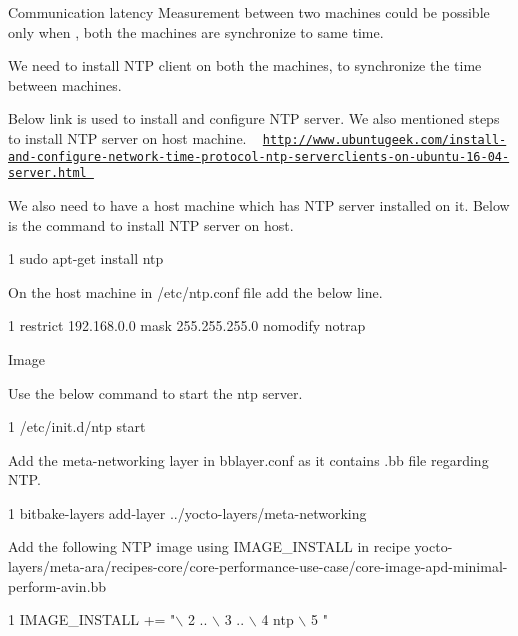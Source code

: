 \begin{DoxyEnumerate}
\item Communication latency Measurement between two machines could be possible only when , both the machines are synchronize to same time.
\item We need to install N\+TP client on both the machines, to synchronize the time between machines.
\item Below link is used to install and configure N\+TP server. We also mentioned steps to install N\+TP server on host machine. ~\newline
 \href{http://www.ubuntugeek.com/install-and-configure-network-time-protocol-ntp-serverclients-on-ubuntu-16-04-server.html}{\tt http\+://www.\+ubuntugeek.\+com/install-\/and-\/configure-\/network-\/time-\/protocol-\/ntp-\/serverclients-\/on-\/ubuntu-\/16-\/04-\/server.\+html }
\item We also need to have a host machine which has N\+TP server installed on it. Below is the command to install N\+TP server on host. 
\begin{DoxyCode}
1 sudo apt-get install ntp
\end{DoxyCode}

\item On the host machine in /etc/ntp.conf file add the below line. 
\begin{DoxyCode}
1 restrict 192.168.0.0 mask 255.255.255.0 nomodify notrap
\end{DoxyCode}

\item Image 
\item Use the below command to start the ntp server. 
\begin{DoxyCode}
1 /etc/init.d/ntp start
\end{DoxyCode}

\item Add the meta-\/networking layer in bblayer.\+conf as it contains .bb file regarding N\+TP. 
\begin{DoxyCode}
1 bitbake-layers add-layer ../yocto-layers/meta-networking
\end{DoxyCode}

\item Add the following N\+TP image using I\+M\+A\+G\+E\+\_\+\+I\+N\+S\+T\+A\+LL in recipe yocto-\/layers/meta-\/ara/recipes-\/core/core-\/performance-\/use-\/case/core-\/image-\/apd-\/minimal-\/perform-\/avin.\+bb 
\begin{DoxyCode}
1 IMAGE\_INSTALL += "\(\backslash\)
2         .. \(\backslash\)
3         .. \(\backslash\)
4         ntp \(\backslash\)
5         "
\end{DoxyCode}


\end{DoxyEnumerate}
